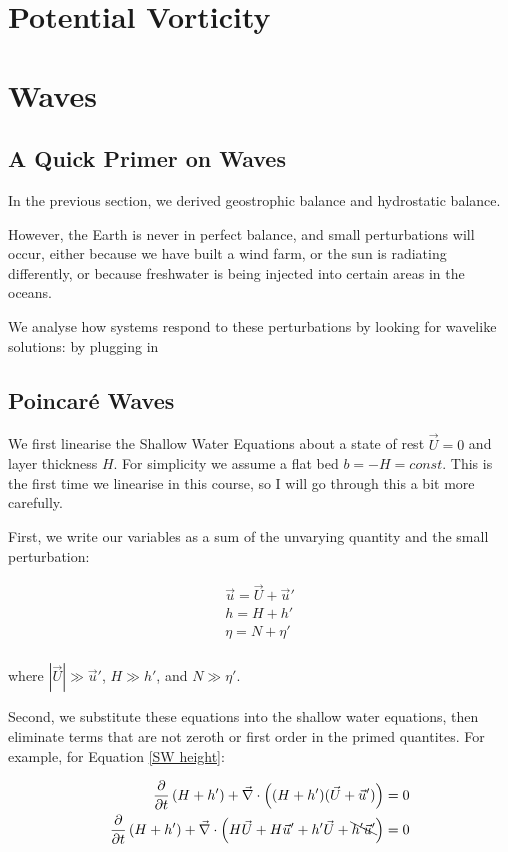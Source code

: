 \section{Potential Vorticity}

\section{Waves}

\subsection{A Quick Primer on Waves}

In the previous section, we derived geostrophic balance and  hydrostatic balance. 

However, the Earth is never in perfect balance, and small perturbations will occur, either because we have built a wind farm, or the sun is radiating differently, or because freshwater is being injected into certain areas in the oceans.

We analyse how systems respond to these perturbations by looking for wavelike solutions: by plugging in 

\subsection{Poincaré Waves}

We first linearise the Shallow Water Equations about a state of rest $\vec{U}=0$ and layer thickness $H$. For simplicity we assume a flat bed $b=-H=const$. This is the first time we linearise in this course, so I will go through this a bit more carefully.

First, we write our variables as a sum of the unvarying quantity and the small perturbation:

\begin{align*}
    \vec{u}=\vec{U}+\vec{u}'\\
    h = H + h'\\
    \eta = N + \eta'\\
\end{align*}

\noindent where $|\vec{U}|\gg \vec{u}'$, $H\gg h'$, and $N\gg \eta'$. 

Second, we substitute these equations into the shallow water equations, then eliminate terms that are not zeroth or first order in the primed quantites. For example, for Equation \ref{SW height}:

\begin{align*}
    \frac{\partial}{\partial t}\left( H+h' \right)+\vec{\nabla}\cdot \left( (H+h')(\vec{U}+\vec{u}') \right)=0\\
    \frac{\partial}{\partial t}\left( H+h' \right)+\vec{\nabla}\cdot \left( H\vec{U}+H\vec{u}'+h'\vec{U}+\bcancel{h'\vec{u}'} \right)=0\\
\end{align*}

